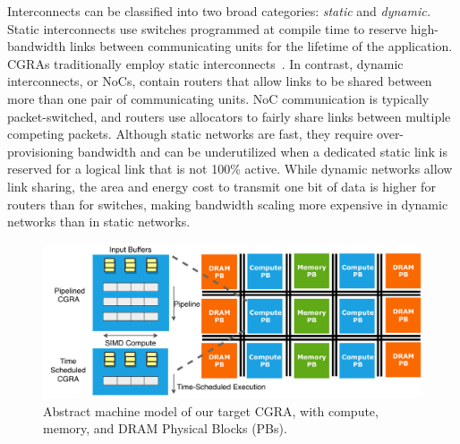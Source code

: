 Interconnects can be classified into two broad categories: \emph{static} and \emph{dynamic.}
 {Static interconnects} use switches programmed at compile time to reserve high-bandwidth links between communicating units for the lifetime of the application.
CGRAs traditionally employ static interconnects~\cite{cgraSurvey1, cgraSurvey2}.
%
In contrast, {dynamic interconnects}, or NoCs, contain routers that allow links to be shared between more than one pair of communicating units.
NoC communication is typically packet-switched, and routers use allocators to fairly share links between multiple competing packets.
Although static networks are fast, they require over-provisioning bandwidth and can be underutilized when a dedicated static link is reserved for a logical link that is not 100\% active. 
While dynamic networks allow link sharing, the area and energy cost to transmit one bit of data is higher for routers than for switches, making bandwidth scaling more expensive in dynamic networks than in static networks.

\begin{figure}
\centering
\includegraphics[width=1\columnwidth]{figs/arch1.pdf}
  \caption{Abstract machine model of our target CGRA, with compute, memory, and DRAM Physical Blocks (PBs).}\label{fig:arch}
\end{figure}

